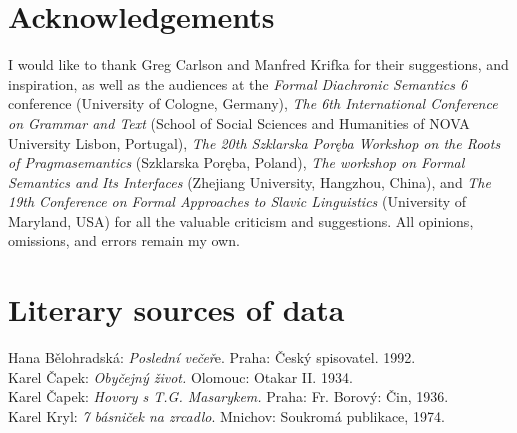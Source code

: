 \documentclass[output=paper,colorlinks,citecolor=brown]{langscibook}
\begin{document}
\section*{Acknowledgements}
I would like to thank Greg Carlson and Manfred Krifka for their suggestions, and inspiration, as well as the audiences at the \textit{Formal Diachronic Semantics 6} conference (University of
Cologne, Germany), \textit{The 6th International Conference on Grammar and Text} (School of Social Sciences and Humanities of NOVA University Lisbon, Portugal), \textit{The 20th Szklarska Poręba Workshop on the Roots of
Pragmasemantics} (Szklarska Poręba, Poland), \textit{The workshop on Formal Semantics and
Its Interfaces} (Zhejiang University, Hangzhou, China),
and \textit{The 19th Conference on Formal Approaches to Slavic
Linguistics} (University of Maryland, USA) for all the valuable criticism and suggestions. All opinions, omissions, and errors remain my own.


\section*{Literary sources of data}

\noindent Hana Bělohradská: \textit{Poslední večeř}e. Praha: Český spisovatel. 1992.\\
\noindent Karel Čapek: \textit{Obyčejný život.} Olomouc: Otakar II. 1934.\\
\noindent Karel Čapek: \textit{Hovory s T.G. Masarykem.} Praha: Fr. Borový: Čin, 1936.\\
Karel Kryl: \textit{7 básniček na zrcadlo}. Mnichov: Soukromá publikace, 1974.

\sloppy
\printbibliography[heading=subbibliography,notkeyword=this]
\end{document}
